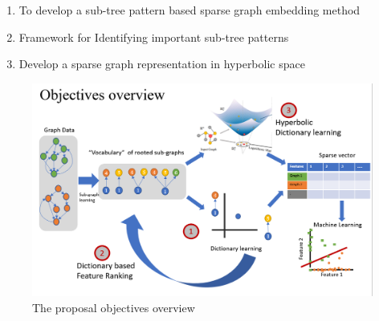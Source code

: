 \begin{enumerate}
    \item To develop a sub-tree pattern based sparse graph embedding method
    \item Framework for Identifying important sub-tree patterns
    \item Develop  a sparse graph representation in hyperbolic space
\end{enumerate}

\begin{figure}[!tbh]
    \centering
    \includegraphics[width=\columnwidth]{figures/presentation/Objective_overview.png}
    \caption[overview]{The proposal objectives overview}\label{fig:obj_overview}
\end{figure}